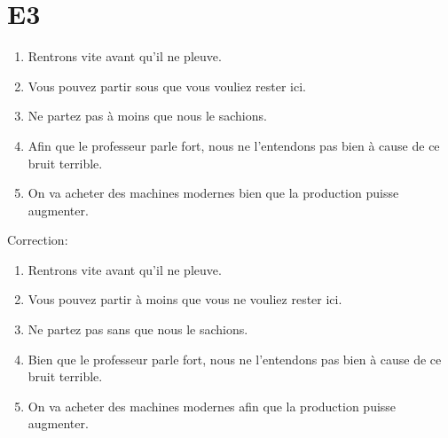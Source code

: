 \documentclass{book}
\begin{document}
    \section{E3}
        \begin{enumerate}
            \item Rentrons vite avant qu'il ne pleuve.
            \item Vous pouvez partir sous que vous vouliez rester ici.
            \item Ne partez pas à moins que nous le sachions.
            \item Afin que le professeur parle fort, nous ne l'entendons pas bien à cause de ce bruit terrible.
            \item On va acheter des machines modernes bien que la production puisse augmenter.
        \end{enumerate}
        Correction:
        \begin{enumerate}
            \item Rentrons vite avant qu'il ne pleuve.
            \item Vous pouvez partir à moins que vous ne vouliez rester ici.
            \item Ne partez pas sans que nous le sachions.
            \item Bien que le professeur parle fort, nous ne l'entendons pas bien à cause de ce bruit terrible.
            \item On va acheter des machines modernes afin que la production puisse augmenter.
        \end{enumerate}
\end{document}
